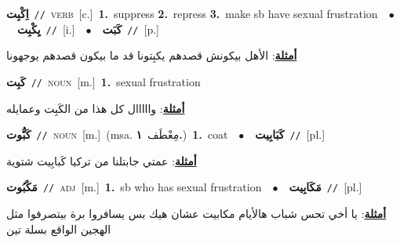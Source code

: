 \documentclass[10pt,a4paper,twoside]{article} %
\begin{document}
\begin{multicols}{2}
{{{{{{{{\setlength\topsep{0pt}\textbf{\foreignlanguage{arabic}{اِكْبِت}}\ {\color{gray}\texttt{//}\color{black}}\ \textsc{verb}\ [c.]\ \textbf{1.}~suppress  \textbf{2.}~repress  \textbf{3.}~make sb have sexual frustration\ \ $\bullet$\ \ \setlength\topsep{0pt}\textbf{\foreignlanguage{arabic}{يِكْبِت}}\ {\color{gray}\texttt{//}\color{black}}\ [i.]\ \ $\bullet$\ \ \setlength\topsep{0pt}\textbf{\foreignlanguage{arabic}{كَبَت}}\ {\color{gray}\texttt{//}\color{black}}\ [p.]\  \begin{flushright}\color{gray}\foreignlanguage{arabic}{\textbf{\underline{\foreignlanguage{arabic}{أمثلة}}}: الأهل بيكونش قصدهم يكبِتونا قد ما بيكون قصدهم يوجهونا}\end{flushright}\color{black}} \vspace{2mm}

{\setlength\topsep{0pt}\textbf{\foreignlanguage{arabic}{كَبِت}}\ {\color{gray}\texttt{//}\color{black}}\ \textsc{noun}\ [m.]\ \textbf{1.}~sexual frustration\  \begin{flushright}\color{gray}\foreignlanguage{arabic}{\textbf{\underline{\foreignlanguage{arabic}{أمثلة}}}: وااااال كل هذا من الكَبِت وعمايله}\end{flushright}\color{black}} \vspace{2mm}

{\setlength\topsep{0pt}\textbf{\foreignlanguage{arabic}{كَبُّوت}}\ {\color{gray}\texttt{//}\color{black}}\ \textsc{noun}\ [m.]\ \color{gray}(msa. \foreignlanguage{arabic}{مِعْطَف}~\foreignlanguage{arabic}{\textbf{١.}})\color{black}\ \textbf{1.}~coat\ \ $\bullet$\ \ \setlength\topsep{0pt}\textbf{\foreignlanguage{arabic}{كَبَابِيت}}\ {\color{gray}\texttt{//}\color{black}}\ [pl.]\  \begin{flushright}\color{gray}\foreignlanguage{arabic}{\textbf{\underline{\foreignlanguage{arabic}{أمثلة}}}: عمتي جابتلنا من تركيا كَبابِيت شتوية}\end{flushright}\color{black}} \vspace{2mm}

{\setlength\topsep{0pt}\textbf{\foreignlanguage{arabic}{مَكْبُوت}}\ {\color{gray}\texttt{//}\color{black}}\ \textsc{adj}\ [m.]\ \textbf{1.}~sb who has sexual frustration\ \ $\bullet$\ \ \setlength\topsep{0pt}\textbf{\foreignlanguage{arabic}{مَكَابِيت}}\ {\color{gray}\texttt{//}\color{black}}\ [pl.]\  \begin{flushright}\color{gray}\foreignlanguage{arabic}{\textbf{\underline{\foreignlanguage{arabic}{أمثلة}}}: يا أخي تحس شباب هالأيام مكابيت عشان هيك بس يسافروا برة بيتصرفوا مثل الهجين الواقع بسلة تين}\end{flushright}\color{black}} \vspace{2mm}

}}}}}}}
\end{multicols}
\end{document}
